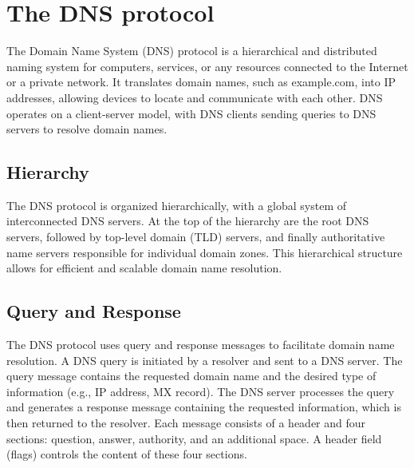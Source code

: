 \section{The DNS protocol}
The Domain Name System (DNS) protocol is a hierarchical and distributed naming system for computers, services, or any resources connected to the Internet or a private network. It translates domain names, such as example.com, into IP addresses, allowing devices to locate and communicate with each other. DNS operates on a client-server model, with DNS clients sending queries to DNS servers to resolve domain names.

\subsection*{Hierarchy}
The DNS protocol is organized hierarchically, with a global system of interconnected DNS servers. At the top of the hierarchy are the root DNS servers, followed by top-level domain (TLD) servers, and finally authoritative name servers responsible for individual domain zones. This hierarchical structure allows for efficient and scalable domain name resolution.


\subsection*{Query and Response}
The DNS protocol uses query and response messages to facilitate domain name resolution. A DNS query is initiated by a resolver and sent to a DNS server. The query message contains the requested domain name and the desired type of information (e.g., IP address, MX record). The DNS server processes the query and generates a response message containing the requested information, which is then returned to the resolver.
Each message consists of a header and four sections: question, answer, authority, and an additional space. A header field (flags) controls the content of these four sections.

